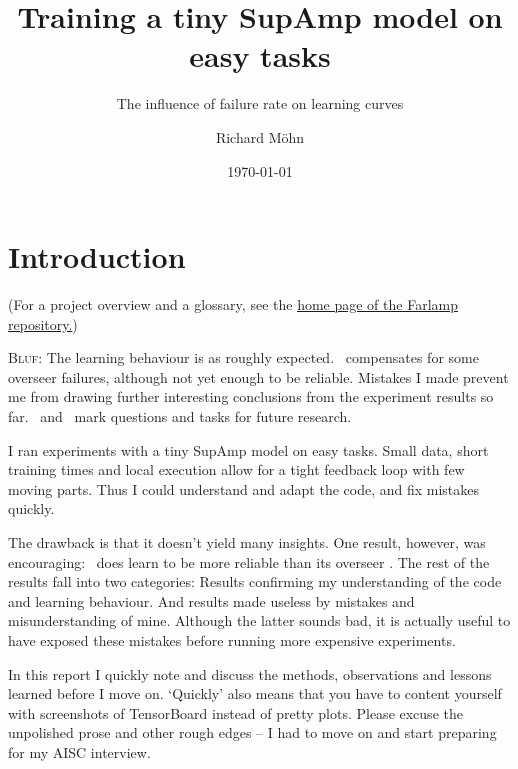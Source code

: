 \documentclass{farlamp}
\title{Training a tiny SupAmp model on easy tasks}
\subtitle{The influence of failure rate on learning curves}
\author{Richard Möhn}
\date{\today}
\begin{document}
\maketitle
\tableofcontents

\section{Introduction}

(For a project overview and a glossary, see the
\href{https://github.com/rmoehn/farlamp}{home page of the Farlamp repository.})

\textsc{Bluf}: The learning behaviour is as roughly expected. \Xpa\ compensates
for some overseer failures, although not yet enough to be reliable. Mistakes I
made prevent me from drawing further interesting conclusions from the experiment
results so far. \OQsymbol\ and \TODOsymbol\ mark questions and tasks for future
research.

I ran experiments with a tiny SupAmp model on easy tasks. Small data, short
training times and local execution allow for a tight feedback loop with few
moving parts. Thus I could understand and adapt the code, and fix mistakes
quickly.

The drawback is that it doesn't yield many insights. One result, however, was
encouraging: \Xpa\ does learn to be more reliable than its overseer \AmpHp. The
rest of the results fall into two categories: Results confirming my
understanding of the code and learning behaviour. And results made useless by
mistakes and misunderstanding of mine. Although the latter sounds bad, it is
actually useful to have exposed these mistakes before running more expensive
experiments.

In this report I quickly note and discuss the methods, observations and lessons
learned before I move on. ‘Quickly’ also means that you have to content yourself
with screenshots of TensorBoard instead of pretty plots. Please excuse the
unpolished prose and other rough edges – I had to move on and start preparing
for my AISC interview.


\end{document}
